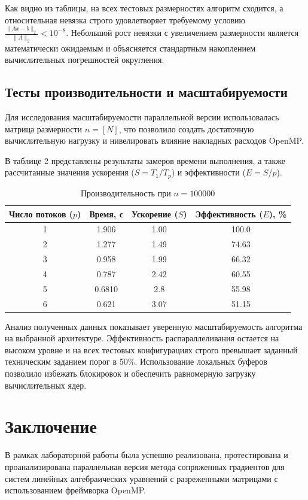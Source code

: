 \documentclass[12pt, a4paper]{article}
\begin{document}
Как видно из таблицы, на всех тестовых размерностях алгоритм сходится, а относительная невязка строго удовлетворяет требуемому условию $\frac{\|Ax - b\|_2}{\|A\|_2} < 10^{-8}$. Небольшой рост невязки с увеличением размерности является математически ожидаемым и объясняется стандартным накоплением вычислительных погрешностей округления.

\subsection{Тесты производительности и масштабируемости}
Для исследования масштабируемости параллельной версии использовалась матрица размерности $n = [N]$, что позволило создать достаточную вычислительную нагрузку и нивелировать влияние накладных расходов OpenMP.

В таблице 2 представлены результаты замеров времени выполнения, а также рассчитанные значения ускорения ($S = T_1 / T_p$) и эффективности ($E = S / p$).

\begin{table}[h]
\centering
\begin{tabular}{|c|c|c|c|}
\hline
\textbf{Число потоков ($p$)} & \textbf{Время, с} & \textbf{Ускорение ($S$)} & \textbf{Эффективность ($E$), \%} \\ \hline
1 & 1.906 & 1.00 & 100.0 \\
2 & 1.277 & 1.49 & 74.63 \\
3 &  0.958 &  1.99 & 66.32 \\
4 &  0.787  & 2.42 & 60.55 \\
5 &  0.6810   &  2.8  & 55.98 \\
6&  0.621  &  3.07   & 51.15 \\
\hline
\end{tabular}
\caption{Производительность при $n=100000$}
\end{table}

Анализ полученных данных показывает уверенную масштабируемость алгоритма на выбранной архитектуре. Эффективность распараллеливания остается на высоком уровне и на всех тестовых конфигурациях строго превышает заданный техническим заданием порог в 50\%. Использование локальных буферов позволило избежать блокировок и обеспечить равномерную загрузку вычислительных ядер.

\section{Заключение}
В рамках лабораторной работы была успешно реализована, протестирована и проанализирована параллельная 
версия метода сопряженных градиентов для систем линейных алгебраических уравнений 
с разреженными матрицами с использованием фреймворка OpenMP.
\end{document}
